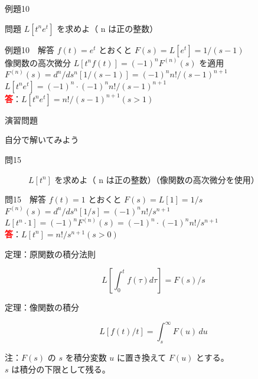 \documentclass[professionalfonts]{beamer}
\begin{document}
\begin{frame}{例題10}
  \begin{exampleblock}{問題}
    $L[t^n e^t]$ を求めよ（ n は正の整数）\\[2pt]
  \end{exampleblock}
\end{frame}

\begin{frame}{例題10　解答}
  $f(t) = e^{t}$ とおくと $F(s) = L[e^{t}] = 1/(s-1)$\\[4pt]
  像関数の高次微分 $L[t^n f(t)] = (-1)^n F^{(n)}(s)$ を適用\\[4pt]
  $F^{(n)}(s) = d^n/ds^n[1/(s-1)] = (-1)^n n!/(s-1)^{n+1}$\\[4pt]
  $L[t^n e^{t}] = (-1)^n\cdot(-1)^n n!/(s-1)^{n+1}$
  \\[8pt]\textcolor{red}{\textbf{答}}：$L[t^n e^{t}] = n!/(s-1)^{n+1}  (s > 1)$
\end{frame}

\begin{frame}{演習問題}
  \begin{exampleblock}{自分で解いてみよう}
  \begin{description}
    \item[問15] $L[t^n]$ を求めよ（ n は正の整数）（像関数の高次微分を使用）
  \end{description}
  \end{exampleblock}
\end{frame}

\begin{frame}{問15　解答}
  $f(t) = 1$ とおくと $F(s) = L[1] = 1/s$\\[4pt]
  $F^{(n)}(s) = d^n/ds^n [1/s] = (-1)^n n!/s^{n+1}$\\[4pt]
  $L[t^n\cdot1] = (-1)^n F^{(n)}(s) = (-1)^n\cdot(-1)^n n!/s^{n+1}$
  \\[8pt]\textcolor{red}{\textbf{答}}：$L[t^n] = n!/s^{n+1}  (s > 0)$
\end{frame}

\begin{frame}{定理：原関数の積分法則}
  \begin{block}{}
  \[
    L[\int_{0}^t f(\tau)d\tau] = F(s)/s
  \]
  \end{block}
\end{frame}

\begin{frame}{定理：像関数の積分}
  \begin{block}{}
  \[
    L[f(t)/t] = \int_{s}^\infty F(u)\,du
  \]
  \end{block}
  \vspace{4pt}
  {\small 注：$F(s)$ の $s$ を積分変数 $u$ に置き換えて $F(u)$ とする。\\
  $s$ は積分の下限として残る。}
\end{frame}
\end{document}
